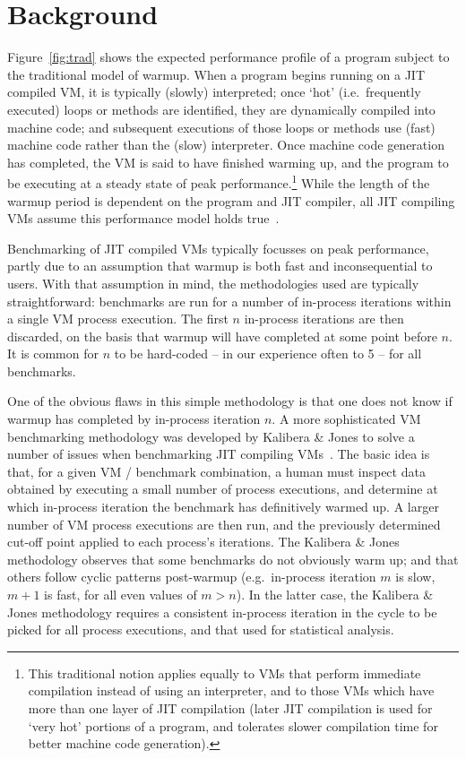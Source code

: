 \documentclass[preprint,numbers,10pt]{sigplanconf}
\newcommand{\kalibera}{Kalibera \& Jones\xspace}
\begin{document}
\section{Background}
\label{sec:warmup}

Figure~\ref{fig:trad} shows the expected performance profile of a
program subject to the traditional model of warmup.
When a program begins running on a JIT compiled VM, it is typically (slowly)
interpreted; once `hot' (i.e.~frequently executed) loops or methods are
identified, they are dynamically compiled into machine code; and subsequent
executions of those loops or methods use (fast) machine code rather than the
(slow) interpreter. Once machine code generation has completed, the VM is
said to have finished warming up, and the program to be executing
at a steady state of peak performance.\footnote{This traditional notion applies equally to VMs
that perform immediate compilation instead of using an interpreter, and to
those VMs which have more than one layer of JIT compilation (later JIT
compilation is used for `very hot' portions of a program, and tolerates slower
compilation time for better machine code generation).}
While the length of the warmup period
is dependent on the program and JIT compiler, all JIT compiling
VMs assume this performance model holds true~\cite{kalibera13rigorous}.

Benchmarking of JIT compiled VMs typically focusses on peak
performance, partly due to an assumption that
warmup is both fast and inconsequential to users. With that assumption in mind, the
methodologies used are typically straightforward: benchmarks are run for a number
of in-process iterations within a single VM process execution.
The first $n$ in-process iterations are then discarded, on the basis that warmup
will have completed at some point before $n$. It is common for
$n$ to be hard-coded -- in our experience often to 5 -- for all benchmarks.

One of the obvious flaws in this simple methodology is that one does not know if warmup
has completed by in-process iteration $n$. A more sophisticated VM benchmarking methodology
was developed by \kalibera to solve a number of issues when benchmarking JIT
compiling VMs~\cite{kalibera12quantifying,kalibera13rigorous}. The basic idea is
that, for a given VM / benchmark combination, a human must inspect data obtained by
executing a small number of process executions, and determine at which in-process iteration the
benchmark has definitively warmed up. A larger number of VM process executions are then
run, and the previously determined cut-off point applied to each process's
iterations. The \kalibera methodology observes that some benchmarks do not
obviously warm up; and that others follow cyclic patterns post-warmup
(e.g.~in-process iteration $m$ is slow, $m+1$ is fast, for all even values of $m > n$). In
the latter case, the \kalibera methodology requires a consistent in-process iteration in
the cycle to be picked for all process executions, and that used for statistical analysis.
\end{document}

